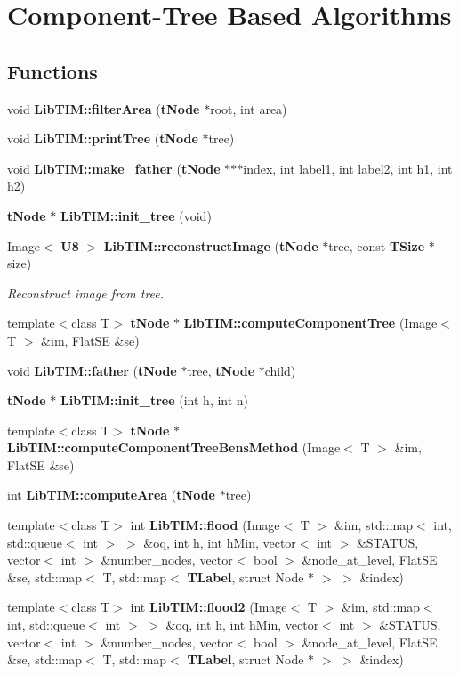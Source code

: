 \section{Component-Tree Based Algorithms}
\label{group__ccTree}
\subsection*{Functions}
\begin{CompactItemize}
\item 
void {\bf Lib\-TIM::filter\-Area} ({\bf t\-Node} $\ast$root, int area)
\item 
void {\bf Lib\-TIM::print\-Tree} ({\bf t\-Node} $\ast$tree)
\item 
void {\bf Lib\-TIM::make\_\-father} ({\bf t\-Node} $\ast$$\ast$$\ast$index, int label1, int label2, int h1, int h2)
\item 
{\bf t\-Node} $\ast$ {\bf Lib\-TIM::init\_\-tree} (void)
\item 
Image$<$ {\bf U8} $>$ {\bf Lib\-TIM::reconstruct\-Image} ({\bf t\-Node} $\ast$tree, const {\bf TSize} $\ast$size)
\begin{CompactList}\small\item\em Reconstruct image from tree. \item\end{CompactList}\item 
template$<$class T$>$ {\bf t\-Node} $\ast$ {\bf Lib\-TIM::compute\-Component\-Tree} (Image$<$ T $>$ \&im, Flat\-SE \&se)
\item 
void {\bf Lib\-TIM::father} ({\bf t\-Node} $\ast$tree, {\bf t\-Node} $\ast$child)
\item 
{\bf t\-Node} $\ast$ {\bf Lib\-TIM::init\_\-tree} (int h, int n)
\item 
template$<$class T$>$ {\bf t\-Node} $\ast$ {\bf Lib\-TIM::compute\-Component\-Tree\-Bens\-Method} (Image$<$ T $>$ \&im, Flat\-SE \&se)
\item 
int {\bf Lib\-TIM::compute\-Area} ({\bf t\-Node} $\ast$tree)
\item 
template$<$class T$>$ int {\bf Lib\-TIM::flood} (Image$<$ T $>$ \&im, std::map$<$ int, std::queue$<$ int $>$ $>$ \&oq, int h, int h\-Min, vector$<$ int $>$ \&STATUS, vector$<$ int $>$ \&number\_\-nodes, vector$<$ bool $>$ \&node\_\-at\_\-level, Flat\-SE \&se, std::map$<$ T, std::map$<$ {\bf TLabel}, struct Node $\ast$ $>$ $>$ \&index)
\item 
template$<$class T$>$ int {\bf Lib\-TIM::flood2} (Image$<$ T $>$ \&im, std::map$<$ int, std::queue$<$ int $>$ $>$ \&oq, int h, int h\-Min, vector$<$ int $>$ \&STATUS, vector$<$ int $>$ \&number\_\-nodes, vector$<$ bool $>$ \&node\_\-at\_\-level, Flat\-SE \&se, std::map$<$ T, std::map$<$ {\bf TLabel}, struct Node $\ast$ $>$ $>$ \&index)

\end{CompactItemize}
